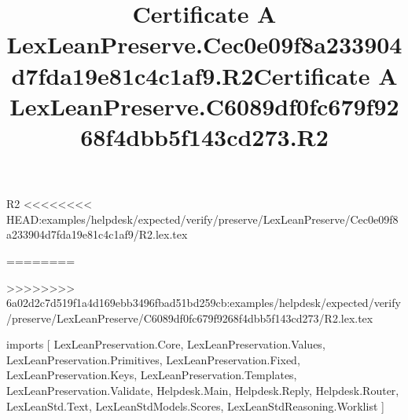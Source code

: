 \begin{lexlean}{R2}
<<<<<<<< HEAD:examples/helpdesk/expected/verify/preserve/LexLeanPreserve/Cec0e09f8a233904d7fda19e81c4c1af9/R2.lex.tex
\title{Certificate A LexLeanPreserve.Cec0e09f8a233904d7fda19e81c4c1af9.R2}
========
\title{Certificate A LexLeanPreserve.C6089df0fc679f9268f4dbb5f143cd273.R2}
>>>>>>>> 6a02d2c7d519f1a4d169ebb3496fbad51bd259cb:examples/helpdesk/expected/verify/preserve/LexLeanPreserve/C6089df0fc679f9268f4dbb5f143cd273/R2.lex.tex
\begin{coremodule}
imports [
  LexLeanPreservation.Core,
  LexLeanPreservation.Values,
  LexLeanPreservation.Primitives,
  LexLeanPreservation.Fixed,
  LexLeanPreservation.Keys,
  LexLeanPreservation.Templates,
  LexLeanPreservation.Validate,
  Helpdesk.Main,
  Helpdesk.Reply,
  Helpdesk.Router,
  LexLeanStd.Text,
  LexLeanStdModels.Scores,
  LexLeanStdReasoning.Worklist
]


\end{coremodule}
\end{lexlean}

